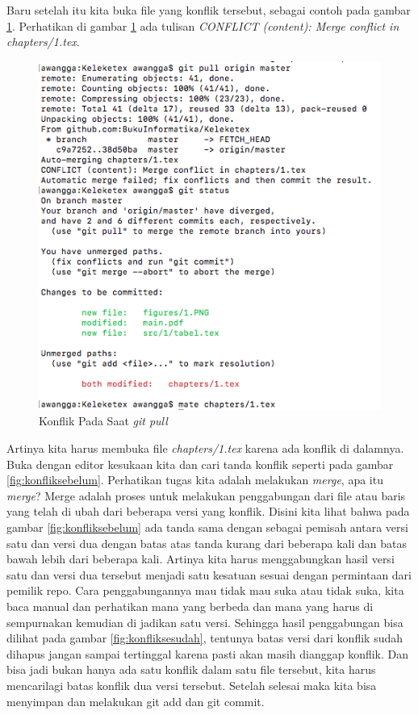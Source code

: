 Baru setelah itu kita buka file yang konflik tersebut, sebagai contoh pada gambar \ref{fig:fileyangkonflik}. Perhatikan di gambar \ref{fig:fileyangkonflik} ada tulisan \textit{CONFLICT (content): Merge conflict in chapters/1.tex}. 

\begin{figure}[!htbp]
\centerline{\includegraphics[width=.75\textwidth]{Figures/fileyangkonflik}}
\caption{Konflik Pada Saat \textit{git pull}}
\label{fig:fileyangkonflik}
\end{figure}

Artinya kita harus membuka file \textit{chapters/1.tex} karena ada konflik di dalamnya. Buka dengan editor kesukaan kita dan cari tanda konflik seperti pada gambar \ref{fig:konfliksebelum}. Perhatikan tugas kita adalah melakukan \textit{merge}, apa itu \textit{merge}? Merge adalah proses untuk melakukan penggabungan dari file atau baris yang telah di ubah dari beberapa versi yang konflik. Disini kita lihat bahwa pada gambar \ref{fig:konfliksebelum} ada tanda sama dengan sebagai pemisah antara versi satu dan versi dua dengan batas atas tanda kurang dari beberapa kali dan batas bawah lebih dari beberapa kali. Artinya kita harus menggabungkan hasil versi satu dan versi dua tersebut menjadi satu kesatuan sesuai dengan permintaan dari pemilik repo. Cara penggabungannya mau tidak mau suka atau tidak suka, kita baca manual dan perhatikan mana yang berbeda dan mana yang harus di sempurnakan kemudian di jadikan satu versi. Sehingga hasil penggabungan bisa dilihat pada gambar \ref{fig:konfliksesudah}, tentunya batas versi dari konflik sudah dihapus jangan sampai tertinggal karena pasti akan masih dianggap konflik. Dan bisa jadi bukan hanya ada satu konflik dalam satu file tersebut, kita harus mencarilagi batas konflik dua versi tersebut. Setelah selesai maka kita bisa menyimpan dan melakukan git add dan git commit.


